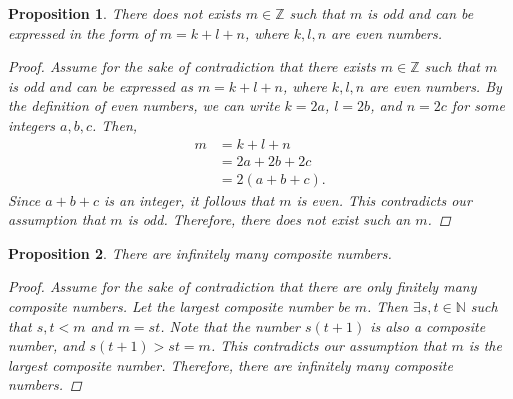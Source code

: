 \documentclass[12pt]{article}
\newcommand{\N}{\mathbb{N}} %
\newcommand{\Z}{\mathbb{Z}} %
\newtheorem{proposition}{Proposition}
\begin{document}
\begin{proposition}
  There does not exists $m \in \Z$ such that $m$ is odd and can be expressed in the form of
  $m = k + l + n$, where $k, l, n$ are even numbers.
  \begin{proof}
    Assume for the sake of contradiction that there exists $m \in \Z$ such that $m$ is odd and can be expressed as
    $m = k + l + n$, where $k, l, n$ are even numbers.
    By the definition of even numbers, we can write $k = 2a$, $l = 2b$, and $n = 2c$ for some integers $a, b, c$.
    Then,
    \begin{align*}
      m & = k + l + n     \\
        & = 2a + 2b + 2c  \\
        & = 2(a + b + c).
    \end{align*}
    Since $a + b + c$ is an integer, it follows that $m$ is even.
    This contradicts our assumption that $m$ is odd.
    Therefore, there does not exist such an $m$.
  \end{proof}
\end{proposition}


\begin{proposition}
  There are infinitely many composite numbers.
  \begin{proof}
    Assume for the sake of contradiction that there are only finitely many composite numbers.
    Let the largest composite number be $m$.
    Then $\exists s, t \in \N$ such that $s, t < m$ and $m = st$.
    Note that the number $s(t + 1)$ is also a composite number, and $s(t + 1) > st = m$.
    This contradicts our assumption that $m$ is the largest composite number.
    Therefore, there are infinitely many composite numbers.
  \end{proof}
\end{proposition}
\end{document}
